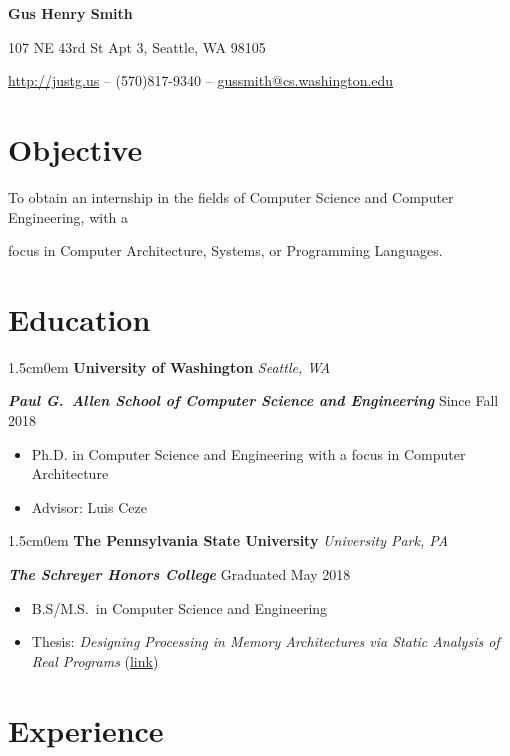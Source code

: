 \documentclass[letterpaper]{article}
\newcommand{\primaryindent}{1.5cm} %
\newcommand{\name}[1]{ 
	\Huge  \textsf{\textbf{#1}}
	\vspace{0.1em}
	\par \normalsize \normalfont}
\newcommand{\personalinfo}[1]{
	\large  #1 
	\par \normalsize \normalfont}
\newenvironment{indented}{\begin{adjustwidth}{\primaryindent}{0em}}{\end{adjustwidth}}
\newenvironment{resumelist}{\begin{itemize}[topsep=0pt,noitemsep,itemindent=-15pt,leftmargin=30pt]}{\end{itemize}}
\newcommand{\generalentry}[5]{
	\begin{indented}
		\Large \textsf{\textbf{#1}} \hfill	%
			\hfill\normalsize\textit{#2} \par  			%
		\noindent \large \textsf{\textbf{\textit{#3}}} 	%
			\hfill \normalsize #4\par 					%
		\normalsize \normalfont #5 \par					%
		\normalsize \normalfont
	\end{indented}
	}
\begin{document}
	
	
\begin{center}
	\name{Gus Henry Smith}
	\personalinfo{107 NE 43rd St Apt 3, Seattle, WA 98105}
	\personalinfo{\url{http://justg.us} -- (570)817-9340 -- \href{mailto:gussmith@uw.edu}{gussmith@cs.washington.edu}}
\end{center}

\section*{Objective}

\hspace{2cm} %
To obtain an internship in the fields of Computer Science and Computer Engineering, with a

\hspace{2cm} focus in Computer Architecture, Systems, or Programming Languages.

\section*{Education}

\generalentry{University of Washington}{Seattle, WA}{Paul G.~Allen School of Computer Science and Engineering}{Since Fall 2018}{
	\begin{resumelist}
		\item Ph.D. in Computer Science and Engineering with a focus in Computer Architecture
		\item Advisor: Luis Ceze
	\end{resumelist}
}

\vspace{2mm}

\generalentry{The Pennsylvania State University}{University Park, PA}{The Schreyer Honors College}{Graduated May 2018}{
	\begin{resumelist}
		\item B.S/M.S.~in Computer Science and Engineering
		\item Thesis: \textit{Designing Processing in Memory Architectures via Static Analysis of Real Programs} (\href{https://github.com/gussmith23/masters-thesis/releases}{link})
	\end{resumelist}
}


\section*{Experience}
\end{document}
